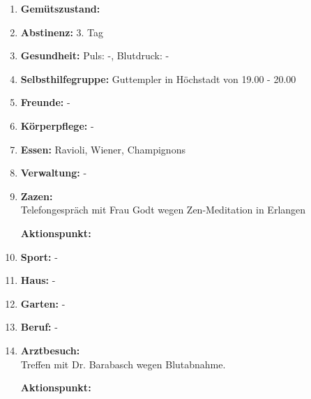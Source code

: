 \documentclass[10pt,a4paper]{article}
\newcommand\opti[1] {{\color {amethyst} {\bf #1}}}        %
\newcommand\mand[1] {{\color {burntorange} {\bf #1}}}     %
\begin{document}
\vskip 4pt
\hskip -6pt
\begin{minipage}{0.95\textwidth}  
  \begin{enumerate}
    \setlength\itemsep{-3pt}

  \item {\mand {Gemütszustand:}} \dSmiley [1.5][yellow]
  \item {\mand {Abstinenz:}} 3. Tag
  \item {\mand {Gesundheit:}} Puls: -, Blutdruck: -
  \item {\mand {Selbsthilfegruppe:}} Guttempler in Höchstadt von 19.00 - 20.00
  \item {\mand {Freunde:}} -
  \item {\mand {Körperpflege:}} -
  \item {\mand {Essen:}} Ravioli, Wiener, Champignons
  \item {\mand {Verwaltung:}} -
    
  \item {\mand {Zazen:}} \\
    Telefongespräch mit Frau Godt wegen Zen-Meditation in Erlangen
            
    {\bf Aktionspunkt:}
    
    \begin{minipage}{0.75\textwidth}  
    \end{minipage}

  \item {\mand {Sport:}} -
  \item {\mand {Haus:}} -
  \item {\mand {Garten:}} -
  \item {\mand {Beruf:}} -
  \item {\opti {Arztbesuch:}} \\
    Treffen mit Dr. Barabasch wegen Blutabnahme.
        
    {\bf Aktionspunkt:}
    
    \begin{minipage}{0.75\textwidth}  
    \end{minipage}
    
  \end{enumerate}
\end{minipage}
\end{document}
